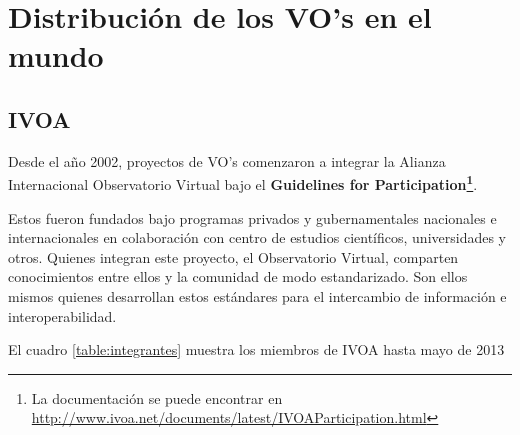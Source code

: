 \section{Distribución de los VO's en el mundo}
\subsection{IVOA}

Desde el año 2002, proyectos de VO's comenzaron a integrar
la Alianza Internacional Observatorio Virtual bajo el \textbf{Guidelines
for Participation\footnote{La documentación se puede
encontrar en \url{http://www.ivoa.net/documents/latest/IVOAParticipation.html}}}.

Estos fueron fundados bajo programas privados y gubernamentales nacionales e
internacionales en colaboración con centro de estudios científicos,
universidades y otros. Quienes integran este proyecto, el Observatorio Virtual, 
comparten conocimientos entre ellos y la comunidad de modo estandarizado. Son 
ellos mismos quienes desarrollan estos estándares para el intercambio de 
información e interoperabilidad.

El cuadro \ref{table:integrantes} muestra los miembros de IVOA hasta mayo de
2013

